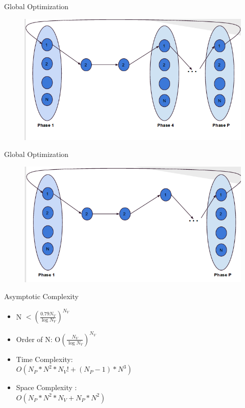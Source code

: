 \documentclass{beamer}
\begin{document}
\begin{frame}{Global Optimization}
\begin{figure}
\includegraphics[scale=0.5]{images/go2}
\end{figure}
\end{frame}

\begin{frame}{Global Optimization}
\begin{figure}
\includegraphics[scale=0.5]{images/go3}
\end{figure}
\end{frame}

\begin{frame}{Asymptotic Complexity}
\begin{itemize}
\item N  $< \left(\frac{0.79N_V}{\log N_V}\right)^{N_V}$
\item Order of N: O$\left(\frac{N_V}{\log N_V}\right) ^{N_V}$
\item Time Complexity: \\
$O\left(N_P*N^{2}*N_V! + \left(N_P-1\right)*N^{3}\right)$
\item Space Complexity : \\
		$O\left(N_P*N^{2}*N_V + N_P*N^{2}\right)$
\end{itemize}
\end{frame}
\end{document}
